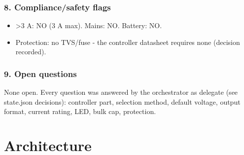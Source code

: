 \documentclass[11pt,a4paper]{article}
\begin{document}
\subsubsection*{8. Compliance/safety flags}
\begin{itemize}
\item \textgreater{}3 A: NO (3 A max). Mains: NO. Battery: NO.
\item Protection: no TVS/fuse - the controller datasheet requires none (decision recorded).
\end{itemize}
\subsubsection*{9. Open questions}
None open. Every question was answered by the orchestrator as delegate (see state.json decisions): controller part, selection method, default voltage, output format, current rating, LED, bulk cap, protection.

\section{Architecture}
\end{document}

